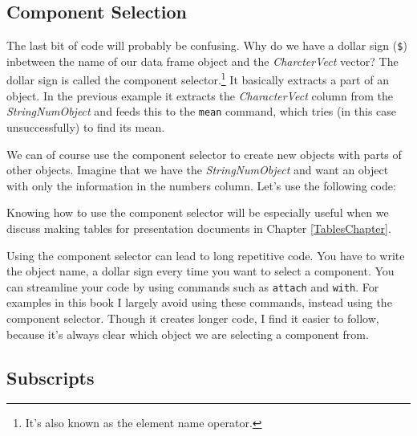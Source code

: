 \subsection{Component Selection}

The last bit of code will probably be confusing. Why do we have a dollar sign (\texttt{\$}) inbetween the name of our data frame object and the {\emph{CharcterVect}} vector? The dollar sign is called the component selector.\footnote{It's also known as the element name operator.} It basically extracts a part of an object. In the previous example it extracts the {\emph{CharacterVect}} column from the {\emph{StringNumObject}} and feeds this to the \texttt{mean} command, which tries (in this case unsuccessfully) to find its mean.

We can of course use the component selector to create new objects with parts of other objects. Imagine that we have the {\emph{StringNumObject}} and want an object with only the information in the numbers column. Let's use the following code:

\begin{knitrout}
\color{fgcolor}
\end{knitrout}


\noindent Knowing how to use the component selector will be especially useful when we discuss making tables for presentation documents in Chapter \ref{TablesChapter}.

Using the component selector can lead to long repetitive code. You have to write the object name, a dollar sign every time you want to select a component. You can streamline your code by using commands such as \texttt{attach} and \texttt{with}. For examples in this book I largely avoid using these commands, instead using the component selector. Though it creates longer code, I find it easier to follow, because it's always clear which object we are selecting a component from.

\subsection{Subscripts}

